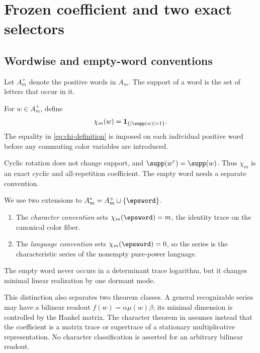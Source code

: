 \section{Frozen coefficient and two exact selectors}
\label{sec:selectors}

\subsection{Wordwise and empty-word conventions}

Let \(A_m^+\) denote the positive words in \(A_m\).  The support of a word is
the set of letters that occur in it.

\begin{definition}
For \(w\in A_m^+\), define
\begin{equation}
 \chi_m(w)=\mathbf 1_{\{|\supp(w)|=1\}}.
 \label{eq:chi-definition}
\end{equation}
The equality in \eqref{eq:chi-definition} is imposed on each individual
positive word before any commuting color variables are introduced.
\end{definition}

Cyclic rotation does not change support, and
\(\supp(w^r)=\supp(w)\).  Thus \(\chi_m\) is an exact cyclic and
all-repetition coefficient.  The empty word needs a separate convention.

\begin{convention}
We use two extensions to \(A_m^*=A_m^+\cup\{\epsword\}\).
\begin{enumerate}
 \item The \emph{character convention} sets
 \(\chi_m(\epsword)=m\), the identity trace on the canonical color fiber.
 \item The \emph{language convention} sets
 \(\chi_m(\epsword)=0\), so the series is the characteristic series of the
 nonempty pure-power language.
\end{enumerate}
The empty word never occurs in a determinant trace logarithm, but it changes
minimal linear realization by one dormant mode.
\end{convention}

This distinction also separates two theorem classes.  A general recognizable
series may have a bilinear readout
\(f(w)=\alpha\mu(w)\beta\); its minimal dimension is controlled by the Hankel
matrix.  The character theorem in  assumes instead that
the coefficient is a matrix trace or supertrace of a stationary
multiplicative representation.  No character classification is asserted for
an arbitrary bilinear readout.

